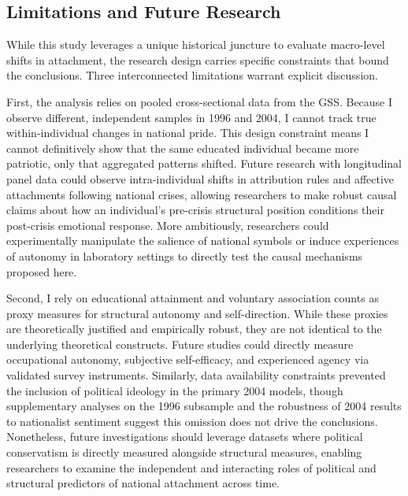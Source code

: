\documentclass[12pt,letterpaper]{article}
\begin{document}
\subsection{Limitations and Future Research}

While this study leverages a unique historical juncture to evaluate macro-level shifts in attachment, the research design carries specific constraints that bound the conclusions. Three interconnected limitations warrant explicit discussion.

First, the analysis relies on pooled cross-sectional data from the GSS. Because I observe different, independent samples in 1996 and 2004, I cannot track true within-individual changes in national pride. This design constraint means I cannot definitively show that the same educated individual became more patriotic, only that aggregated patterns shifted. Future research with longitudinal panel data could observe intra-individual shifts in attribution rules and affective attachments following national crises, allowing researchers to make robust causal claims about how an individual's pre-crisis structural position conditions their post-crisis emotional response. More ambitiously, researchers could experimentally manipulate the salience of national symbols or induce experiences of autonomy in laboratory settings to directly test the causal mechanisms proposed here.

Second, I rely on educational attainment and voluntary association counts as proxy measures for structural autonomy and self-direction. While these proxies are theoretically justified and empirically robust, they are not identical to the underlying theoretical constructs. Future studies could directly measure occupational autonomy, subjective self-efficacy, and experienced agency via validated survey instruments. Similarly, data availability constraints prevented the inclusion of political ideology in the primary 2004 models, though supplementary analyses on the 1996 subsample and the robustness of 2004 results to nationalist sentiment suggest this omission does not drive the conclusions. Nonetheless, future investigations should leverage datasets where political conservatism is directly measured alongside structural measures, enabling researchers to examine the independent and interacting roles of political and structural predictors of national attachment across time.
\end{document}
